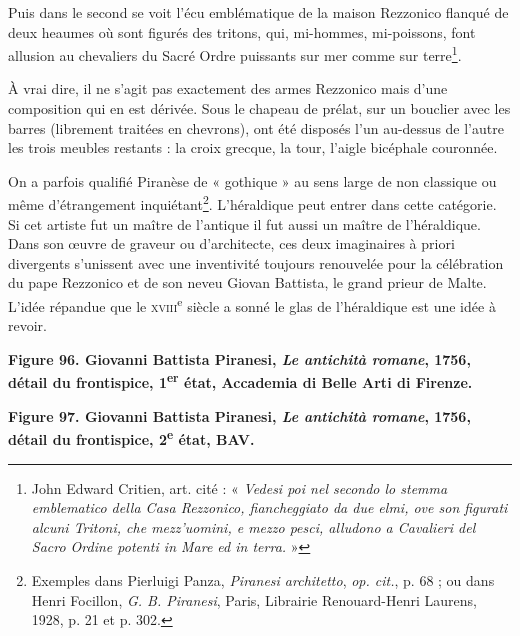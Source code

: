 \documentclass[12pt,twoside,openany]{book}
\renewenvironment{quote}
  {%
    \par\begingroup
    \fontsize{11pt}{14pt}\selectfont
    \list{}{\leftmargin=1.5em\rightmargin=1.5em}%
    \item\relax
  }
  {%
    \endlist
    \endgroup
  }
\newenvironment{PurhBlockQuote}
  {%
    \begin{quote}
  }
  {%
    \end{quote}
  }
\begin{document}
\begin{PurhBlockQuote}
Puis dans le second se voit l’écu emblématique de la maison Rezzonico flanqué de deux heaumes où sont figurés des tritons, qui, mi-hommes, mi-poissons, font allusion au chevaliers du Sacré Ordre puissants sur mer comme sur terre\footnote{John Edward Critien, art. cité : « \textit{Vedesi poi nel secondo lo stemma emblematico della Casa Rezzonico, fiancheggiato da due elmi, ove son figurati alcuni Tritoni, che mezz’uomini, e mezzo pesci, alludono a Cavalieri del Sacro Ordine potenti in Mare ed in terra.} »}.
\end{PurhBlockQuote}

À vrai dire, il ne s’agit pas exactement des armes Rezzonico mais d’une composition qui en est dérivée. Sous le chapeau de prélat, sur un bouclier avec les barres (librement traitées en chevrons), ont été disposés l’un au-dessus de l’autre les trois meubles restants : la croix grecque, la tour, l’aigle bicéphale couronnée.

On a parfois qualifié Piranèse de « gothique » au sens large de non classique ou même d’étrangement inquiétant\footnote{Exemples dans Pierluigi Panza, \textit{Piranesi architetto},\textit{ op. cit.}, p. 68 ; ou dans Henri Focillon, \textit{G. B. Piranesi}, Paris, Librairie Renouard-Henri Laurens, 1928, p. 21 et p. 302.}. L’héraldique peut entrer dans cette catégorie. Si cet artiste fut un maître de l’antique il fut aussi un maître de l’héraldique. Dans son œuvre de graveur ou d’architecte, ces deux imaginaires à priori divergents s’unissent avec une inventivité toujours renouvelée pour la célébration du pape Rezzonico et de son neveu Giovan Battista, le grand prieur de Malte. L’idée répandue que le \textsc{xviii}\textsuperscript{e} siècle a sonné le glas de l’héraldique est une idée à revoir.

\begin{center}
\par\small \textbf{Figure 96. Giovanni Battista Piranesi, \textit{Le antichità romane}, 1756, détail du frontispice, 1\textsuperscript{er} état, Accademia di Belle Arti di Firenze.}
\end{center}

\begin{center}
\par\small \textbf{Figure 97. Giovanni Battista Piranesi, \textit{Le antichità romane}, 1756, détail du frontispice, 2\textsuperscript{e} état, BAV.}
\end{center}
\end{document}
